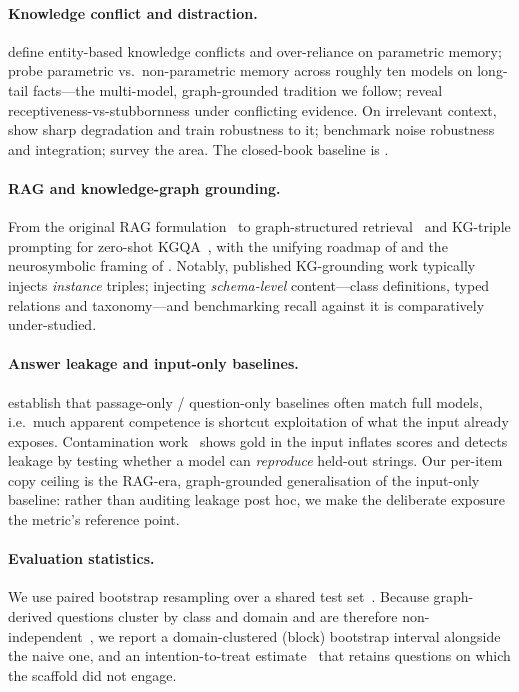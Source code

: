 \documentclass[11pt]{article}
\begin{document}
\paragraph{Knowledge conflict and distraction.}
\textcite{longpre2021entity} define entity-based knowledge conflicts and over-reliance on
parametric memory; \textcite{mallen2023trust} probe parametric vs.\ non-parametric memory across
roughly ten models on long-tail facts---the multi-model, graph-grounded tradition we follow;
\textcite{xie2024chameleon} reveal receptiveness-vs-stubbornness under conflicting evidence.
On irrelevant context, \textcite{shi2023distracted} show sharp degradation and
\textcite{yoran2024robust} train robustness to it; \textcite{chen2024rgb} benchmark noise
robustness and integration; \textcite{xu2024knowledgeconflicts} survey the area. The
closed-book baseline is \textcite{roberts2020knowledge}.

\paragraph{RAG and knowledge-graph grounding.}
From the original RAG formulation~\cite{lewis2020rag} to graph-structured
retrieval~\cite{edge2024graphrag,guo2024lightrag} and KG-triple prompting for zero-shot
KGQA~\cite{baek2023kaping}, with the unifying roadmap of \textcite{pan2024unifying} and the
neurosymbolic framing of \textcite{garcez2023neurosymbolic}. Notably, published KG-grounding work
typically injects \emph{instance} triples; injecting \emph{schema-level} content---class
definitions, typed relations and taxonomy---and benchmarking recall against it is comparatively
under-studied.

\paragraph{Answer leakage and input-only baselines.}
\textcite{kaushik2018reading} establish that passage-only / question-only baselines often match
full models, i.e.\ much apparent competence is shortcut exploitation of what the input already
exposes. Contamination work~\cite{sainz2023contamination,golchin2024timetravel} shows gold in
the input inflates scores and detects leakage by testing whether a model can \emph{reproduce}
held-out strings. Our per-item copy ceiling is the RAG-era, graph-grounded generalisation of the
input-only baseline: rather than auditing leakage post hoc, we make the deliberate exposure the
metric's reference point.

\paragraph{Evaluation statistics.}
We use paired bootstrap resampling over a shared test set~\cite{efron1979bootstrap,koehn2004significance}.
Because graph-derived questions cluster by class and domain and are therefore
non-independent~\cite{dror2018hitchhiker}, we report a domain-clustered (block) bootstrap
interval alongside the naive one, and an intention-to-treat estimate~\cite{hollis1999itt} that
retains questions on which the scaffold did not engage.
\end{document}
